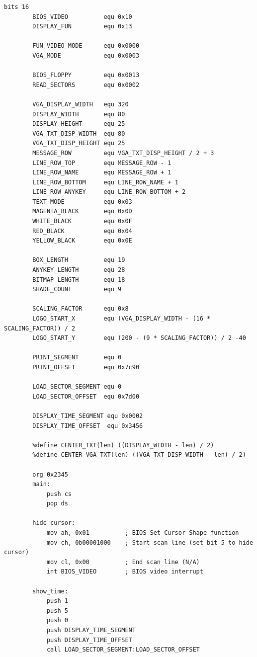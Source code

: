 \documentclass{article}
\begin{document}
    \begin{lstlisting}[caption={loaderV04.asm listing}, captionpos=t]
        bits 16
        BIOS_VIDEO          equ 0x10
        DISPLAY_FUN         equ 0x13

        FUN_VIDEO_MODE      equ 0x0000
        VGA_MODE            equ 0x0003

        BIOS_FLOPPY         equ 0x0013
        READ_SECTORS        equ 0x0002

        VGA_DISPLAY_WIDTH   equ 320
        DISPLAY_WIDTH       equ 80
        DISPLAY_HEIGHT      equ 25
        VGA_TXT_DISP_WIDTH  equ 80
        VGA_TXT_DISP_HEIGHT equ 25
        MESSAGE_ROW         equ VGA_TXT_DISP_HEIGHT / 2 + 3
        LINE_ROW_TOP        equ MESSAGE_ROW - 1
        LINE_ROW_NAME       equ MESSAGE_ROW + 1
        LINE_ROW_BOTTOM     equ LINE_ROW_NAME + 1
        LINE_ROW_ANYKEY     equ LINE_ROW_BOTTOM + 2
        TEXT_MODE           equ 0x03
        MAGENTA_BLACK       equ 0x0D
        WHITE_BLACK         equ 0x0F
        RED_BLACK           equ 0x04
        YELLOW_BLACK        equ 0x0E

        BOX_LENGTH          equ 19
        ANYKEY_LENGTH       equ 28
        BITMAP_LENGTH       equ 18
        SHADE_COUNT         equ 9

        SCALING_FACTOR      equ 0x8
        LOGO_START_X        equ (VGA_DISPLAY_WIDTH - (16 * SCALING_FACTOR)) / 2
        LOGO_START_Y        equ (200 - (9 * SCALING_FACTOR)) / 2 -40

        PRINT_SEGMENT       equ 0
        PRINT_OFFSET        equ 0x7c90

        LOAD_SECTOR_SEGMENT equ 0
        LOAD_SECTOR_OFFSET  equ 0x7d00

        DISPLAY_TIME_SEGMENT equ 0x0002
        DISPLAY_TIME_OFFSET  equ 0x3456

        %define CENTER_TXT(len) ((DISPLAY_WIDTH - len) / 2)
        %define CENTER_VGA_TXT(len) ((VGA_TXT_DISP_WIDTH - len) / 2)

        org 0x2345
        main:
            push cs
            pop ds

        hide_cursor:
            mov ah, 0x01          ; BIOS Set Cursor Shape function
            mov ch, 0b00001000    ; Start scan line (set bit 5 to hide cursor)
            mov cl, 0x00          ; End scan line (N/A)
            int BIOS_VIDEO        ; BIOS video interrupt

        show_time:
            push 1
            push 5
            push 0
            push DISPLAY_TIME_SEGMENT
            push DISPLAY_TIME_OFFSET
            call LOAD_SECTOR_SEGMENT:LOAD_SECTOR_OFFSET



\end{lstlisting}
\end{document}
